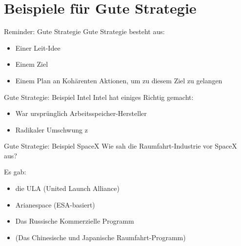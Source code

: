 



\section{Beispiele für Gute Strategie}

\begin{frame}{Reminder: Gute Strategie}
    Gute Strategie besteht aus:
    \begin{itemize}
        \item Einer Leit-Idee
        \item Einem Ziel
        \item Einem Plan an Kohärenten Aktionen, um zu diesem Ziel zu gelangen
    \end{itemize}
\end{frame}

\begin{frame}[c]{Gute Strategie: Beispiel Intel}
    Intel hat einiges Richtig gemacht:
    \begin{itemize}
        \item War ursprünglich Arbeitsspeicher-Hersteller \pause
        \item Radikaler Umschwung z
    \end{itemize}
\end{frame}



\begin{frame}[c]{Gute Strategie: Beispiel SpaceX}
    Wie sah die Raumfahrt-Industrie vor SpaceX aus? \pause


    Es gab:
    \begin{itemize}
        \item die ULA (United Launch Alliance)
        \item Arianespace (ESA-basiert)
        \item Das Russische Kommerzielle Programm
        \item (Das Chinesische und Japanische Raumfahrt-Programm)
    \end{itemize}

\end{frame}



